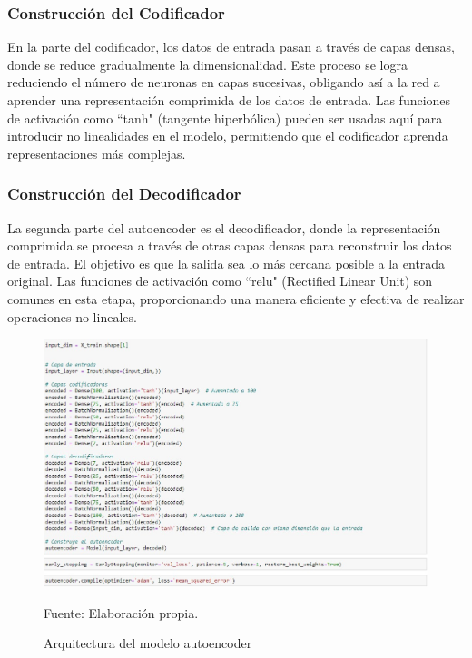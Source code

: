 \subsubsection{Construcción del Codificador}
En la parte del codificador, los datos de entrada pasan a través de capas densas, donde se reduce gradualmente la dimensionalidad. Este proceso se logra reduciendo el número de neuronas en capas sucesivas, obligando así a la red a aprender una representación comprimida de los datos de entrada. Las funciones de activación como \textquotedblleft tanh" (tangente hiperbólica) pueden ser usadas aquí para introducir no linealidades en el modelo, permitiendo que el codificador aprenda representaciones más complejas.

\subsubsection{Construcción del Decodificador} 
La segunda parte del autoencoder es el decodificador, donde la representación comprimida se procesa a través de otras capas densas para reconstruir los datos de entrada. El objetivo es que la salida sea lo más cercana posible a la entrada original. Las funciones de activación como \textquotedblleft relu" (Rectified Linear Unit) son comunes en esta etapa, proporcionando una manera eficiente y efectiva de realizar operaciones no lineales.

\begin{figure}[H]
    \begin{minipage}[t]{0.9\textwidth}
        \caption{Arquitectura del modelo autoencoder}
        \label{arquitectura_autoencoder}        
    \end{minipage}

    \vspace{10pt}

    \begin{minipage}[b]{0.99\textwidth}
        \centering
        \includegraphics[width=\textwidth]{img/Arquitectura modelo autoencoder.jpg}        
    \end{minipage}

    \begin{minipage}[t]{0.9\textwidth}
        Fuente: Elaboración propia.
    \end{minipage}
\end{figure}


